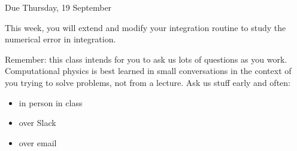 \documentclass[12pt]{article}
\begin{document}
\Large
\centerline{}
\centerline{Due Thursday, 19 September}
\normalsize

This week, you will extend and modify your integration routine to study the numerical error in integration.

Remember: this class intends for you to ask us lots of questions as you work. Computational physics is best learned in 
small conversations in the context of you trying to solve problems, not from a lecture. Ask us stuff early and often:

\begin{itemize}
\item in person in class
\item over Slack
\item over email
\end{itemize}
\end{document}
